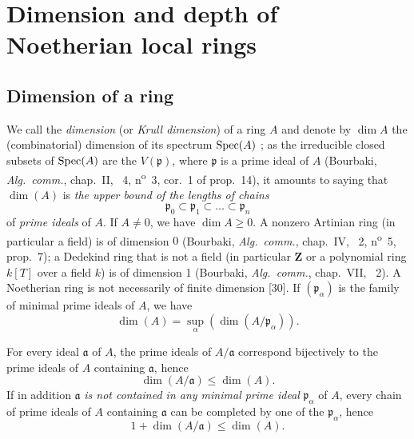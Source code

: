 \section{Dimension and depth of Noetherian local rings}
\label{section:0.16}

\subsection{Dimension of a ring}
\label{subsection:0.16.1}
\label{0.16.1}

\begin{env}[16.1.1]
\label{0.16.1.1}
We call the \emph{dimension} (or \emph{Krull dimension}) of a ring $A$ and denote by $\dim A$ the (combinatorial) dimension of its spectrum $\operatorname{Spec}(A)$ ; as the irreducible closed subsets of $\operatorname{Spec}(A)$ are the $V(\mathfrak{p})$, where $\mathfrak{p}$ is a prime ideal of $A$ (Bourbaki, \emph{Alg.~comm.}, chap.~II, \textsection~4, n\textsuperscript{o}~3, cor.~1 of prop.~14), it amounts to saying that $\dim(A)$ is \emph{the upper bound of the lengths of chains} 
\[
  \mathfrak{p}_0\subset\mathfrak{p}_1\subset\ldots\subset\mathfrak{p}_n
\]
of \emph{prime ideals} of $A$.
If $A\neq 0$, we have $\dim A\geq 0$.
A nonzero Artinian ring (in particular a field) is of dimension $0$ (Bourbaki, \emph{Alg.~comm.}, chap.~IV, \textsection~2, n\textsuperscript{o}~5, prop.~7); a Dedekind ring that is not a field (in particular $\mathbf{Z}$ or a polynomial ring $k[T]$ over a field $k$) is of dimension 1 (Bourbaki, \emph{Alg.~comm.}, chap.~VII, \textsection~2).
A Noetherian ring is not necessarily of finite dimension [30].
If $(\mathfrak{p}_\alpha)$ is the family of minimal prime ideals of $A$, we have 
\begin{equation}
\label{0.16.1.1.1}
\tag{16.1.1.1}
  \dim(A)=\sup_\alpha(\dim(A/\mathfrak{p}_\alpha)).
\end{equation}
\end{env}

\begin{env}[16.1.2]
\label{0.16.1.2}
For every ideal $\mathfrak{a}$ of $A$, the prime ideals of $A/\mathfrak{a}$ correspond bijectively to the prime ideals of $A$ containing $\mathfrak{a}$, hence
\begin{equation}
\label{0.16.1.2.1}
\tag{16.1.2.1}
  \dim(A/\mathfrak{a})\leq\dim(A).
\end{equation}
If in addition $\mathfrak{a}$ \emph{is not contained in any minimal prime ideal} $\mathfrak{p}_\alpha$ of $A$, every chain of prime ideals of $A$ containing $\mathfrak{a}$ can be completed by one of the $\mathfrak{p}_\alpha$, hence
\begin{equation}
\label{0.16.1.2.2}
\tag{16.1.2.2}
  1+\dim(A/\mathfrak{a})\leq\dim(A).
\end{equation}
\end{env}

